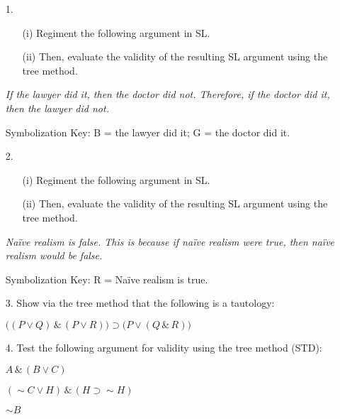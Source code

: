 \documentclass[12pt]{article}
\def\eor{\ensuremath{\vee}}
\def\eand{\ensuremath{\,\&\,}}
\def\eif{\ensuremath{\supset}}
\def\enot{\ensuremath{{\sim}}} %
\let\oldsim\sim %
\renewcommand{\sim}{{\oldsim}} %
\begin{document}
\begin{enumerate}
  \item[1.]
    \begin{itemize}
      \item[(i)] Regiment the following argument in SL.
      \item[(ii)] Then, evaluate the validity of the resulting SL argument using the tree method.
    \end{itemize}
    \item[] \textit{If the lawyer did it, then the doctor did not. Therefore, if the doctor did it, then the lawyer did not.}
    \item[] Symbolization Key: B = the lawyer did it; G = the doctor did it.
      \vspace{.1in}

  \item[2.] 
    \begin{itemize}
      \item[(i)] Regiment the following argument in SL.
      \item[(ii)] Then, evaluate the validity of the resulting SL argument using the tree method.
    \end{itemize}
    \item[] \textit{Na\"ive realism is false. This is because if na\"ive realism were true, then na\"ive realism would be false.}
    \item[] Symbolization Key: R = Na\"ive realism is true.
      \vspace{.1in}

  \item[3.] Show via the tree method that the following is a tautology: 
    \item[] $\big( ( P \eor Q) \eand (P \eor R) \big) \eif \big (P \eor (Q \eand R) \big ) $
      \vspace{.1in}

  \item[4.] Test the following argument for validity using the tree method (STD): 
    \item[] $A \eand (B \eor C)$
    \item[] $(\enot C \eor H) \eand  (H \eif \enot H)$
      \vspace{-.2in}
    \item[] \underline{\hspace{1.75in}}
      \vspace{-.1in}
    \item[] $\enot B$
      \vspace{.1in}


\end{enumerate}
\end{document}
